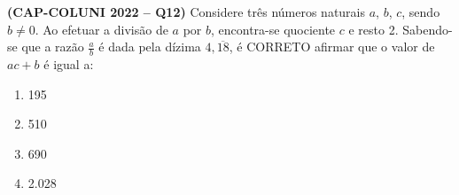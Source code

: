 \textbf{(CAP-COLUNI 2022 -- Q12)} Considere três números naturais $a$, $b$, $c$, sendo $b\neq0$. Ao efetuar a divisão de $a$ por $b$, encontra-se quociente $c$ e resto 2. Sabendo-se que a razão $\frac{a}{b}$ é dada pela dízima $4,\overline{18}$, é CORRETO afirmar que o valor de $ac+b$ é igual a:

\begin{enumerate}
	\item 195
	\item 510
	\item 690
	\item 2.028
\end{enumerate}
